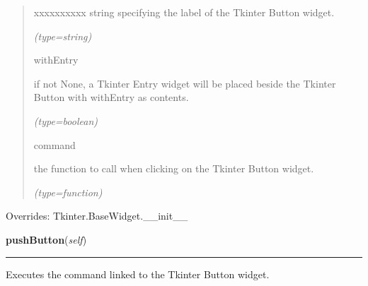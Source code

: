 \begin{boxedminipage}{\funcwidth}
\begin{quote}
\begin{Ventry}{xxxxxxxxxx}
          string specifying the label of the Tkinter Button widget.

            {\it (type=string)}

          \item[withEntry]

          if not None, a Tkinter Entry widget will be placed beside the 
          Tkinter Button with {\textbar}withEntry{\textbar} as contents.

            {\it (type=boolean)}

          \item[command]

          the function to call when clicking on the Tkinter Button widget.

            {\it (type=function)}

        \end{Ventry}

      \end{quote}

      Overrides: Tkinter.BaseWidget.\_\_init\_\_

    \end{boxedminipage}

    \label{nMOLDYN:GUI:Widgets:ComboButton:pushButton}

    \vspace{0.5ex}

\hspace{.8\funcindent}\begin{boxedminipage}{\funcwidth}

    \raggedright \textbf{pushButton}(\textit{self})

    \vspace{-1.5ex}

    \rule{\textwidth}{0.5\fboxrule}
\setlength{\parskip}{2ex}
    Executes the command linked to the Tkinter Button widget.

\setlength{\parskip}{1ex}
    \end{boxedminipage}

    \label{nMOLDYN:GUI:Widgets:ComboButton:getValue}

